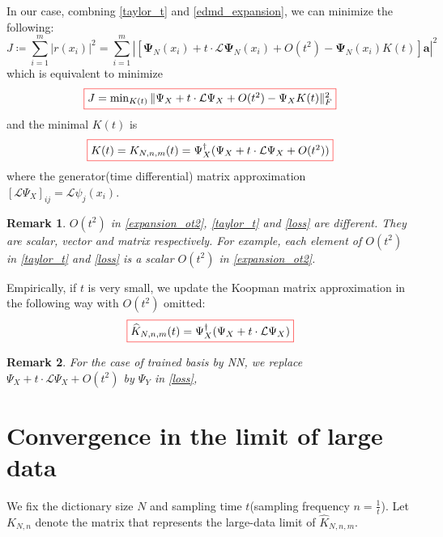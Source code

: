 \documentclass{article}[11]
\newtheorem*{remark}{Remark}
\begin{document}
	In our case, combning \eqref{taylor_t} and \eqref{edmd_expansion}, we can minimize the following:
	\begin{equation*}
		J \coloneqq \sum_{i=1}^m \left| r(x_i) \right|^2 = \sum_{i=1}^m \left| \left[\mathbf{\Psi}_N(x_i) + t \cdot \mathcal{L}\mathbf{\Psi}_N(x_i) + O(t^2) - \mathbf{\Psi}_N(x_i)K(t)\right]\mathbf{a} \right|^2
	\end{equation*}
	which is equivalent to minimize 
	\begin{equation}\label{loss}
		\fcolorbox{red}{white}{$J = \min_{K(t)} \| \Psi_X + t \cdot \mathcal{L}\Psi_X + O(t^2) - \Psi_X K(t) \|_F^2$}
	\end{equation}
	and the minimal $K(t)$ is
	\begin{equation}\label{Koopman_semigroup_formula}
		\fcolorbox{red}{white}{$K(t) = K_{N,n,m}(t) = \Psi_X^{\dagger}(\Psi_X + t \cdot \mathcal{L}\Psi_X + O(t^2))$}
	\end{equation}
	where the generator(time differential) matrix approximation $\left[\mathcal{L}\Psi_X\right]_{ij} = \mathcal{L}\psi_j(x_i)$. 
	\begin{remark}
		$O(t^2)$ in \eqref{expansion_ot2}, \eqref{taylor_t} and \eqref{loss} are different. They are scalar, vector and matrix respectively. For example, each element of $O(t^2)$ in \eqref{taylor_t} and \eqref{loss} is a scalar $O(t^2)$ in \eqref{expansion_ot2}.
	\end{remark}
	
	Empirically, if $t$ is very small, we update the Koopman matrix approximation in the following way with $O(t^2)$ omitted:
	\begin{equation*}
		\fcolorbox{red}{white}{$\widehat{K}_{N,n,m}(t) = \Psi_X^{\dagger}(\Psi_X + t \cdot \mathcal{L}\Psi_X)$}
	\end{equation*}
	\begin{remark}
		For the case of trained basis by NN, we replace $\Psi_X + t \cdot \mathcal{L}\Psi_X + O(t^2)$ by $\Psi_Y$ in \eqref{loss}, 
	\end{remark}
	
	
	\newpage
	\section{Convergence in the limit of large data}
	We fix the dictionary size $N$ and sampling time $t$(sampling frequency $n=\frac{1}{t}$). Let \( K_{N,n} \) denote the matrix that represents the large-data limit of \( \widehat{K}_{N,n,m} \).
	\vspace{5mm}
	
\end{document}
